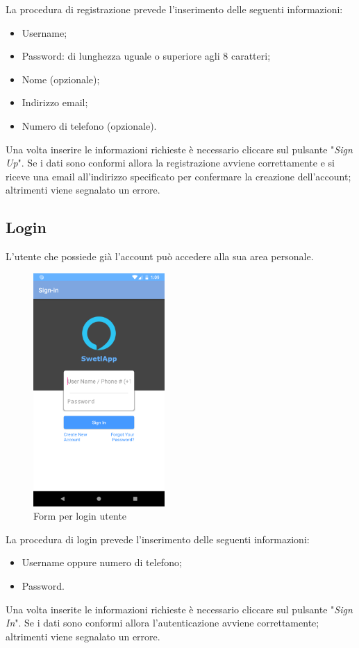 La procedura di registrazione prevede l'inserimento delle seguenti informazioni:
\begin{itemize}
	\item Username;
	\item Password: di lunghezza uguale o superiore agli 8 caratteri;
	\item Nome (opzionale);
	\item Indirizzo email;
	\item Numero di telefono (opzionale).
\end{itemize}
Una volta inserire le informazioni richieste è necessario cliccare sul pulsante "\textit{Sign Up}". Se i dati sono conformi allora la registrazione avviene correttamente e si riceve una email all'indirizzo specificato per confermare la creazione dell'account; altrimenti viene segnalato un errore.
\subsection{Login}
\label{sec:funzionalita_applicazione_login}
L'utente che possiede già l'account può accedere alla sua area personale. 
\begin{figure}[H]
	\centering
	\includegraphics[width=5cm]{../includes/pics/app_login_form.png}
	\caption{\label{fig:app_login_form}Form per login utente}
\end{figure}
La procedura di login prevede l'inserimento delle seguenti informazioni:
\begin{itemize}
	\item Username oppure numero di telefono;
	\item Password.
\end{itemize}
Una volta inserite le informazioni richieste è necessario cliccare sul pulsante "\textit{Sign In}". Se i dati sono conformi allora l'autenticazione avviene correttamente; altrimenti viene segnalato un errore. 
